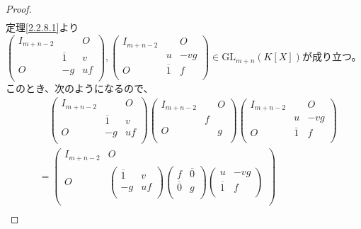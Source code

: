\documentclass[dvipdfmx]{jsarticle}
\begin{document}
\begin{proof}
\begin{align*}
\end{align*}
定理\ref{2.2.8.1}より$\begin{pmatrix}
I_{m + n - 2} & \  & O \\
\  & \overline{1} & v \\
O & - g & uf \\
\end{pmatrix},\begin{pmatrix}
I_{m + n - 2} & \  & O \\
\  & u & - vg \\
O & \overline{1} & f \\
\end{pmatrix} \in {\mathrm{GL}}_{m + n}\left( K[ X] \right)$が成り立つ。このとき、次のようになるので、
\begin{align*}
&\quad \begin{pmatrix}
I_{m + n - 2} & \  & O \\
\  & \overline{1} & v \\
O & - g & uf \\
\end{pmatrix}\begin{pmatrix}
I_{m + n - 2} & \  & O \\
\  & f & \  \\
O & \  & g \\
\end{pmatrix}\begin{pmatrix}
I_{m + n - 2} & \  & O \\
\  & u & - vg \\
O & \overline{1} & f \\
\end{pmatrix}\\
&= \begin{pmatrix}
I_{m + n - 2} & O \\
O & \begin{pmatrix}
\overline{1} & v \\
 - g & uf \\
\end{pmatrix}\begin{pmatrix}
f & \overline{0} \\
\overline{0} & g \\
\end{pmatrix}\begin{pmatrix}
u & - vg \\
\overline{1} & f \\
\end{pmatrix} \\
\end{pmatrix}\\

\end{align*}
\end{proof}
\end{document}
